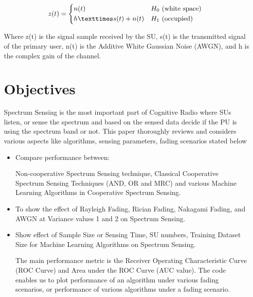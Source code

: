 \begin{equation}
z(t)=
\begin{cases*}
      n(t) & $H_0$ (white space) \\
      h × s(t)+ n(t)   & $H_1$ (occupied)
    \end{cases*}
\end{equation}

Where z(t) is the signal sample received by the SU, s(t) is the transmitted signal of the primary user, n(t) is the Additive White Gaussian Noise (AWGN), and h is the complex gain of the channel.







\section{Objectives}
Spectrum Sensing is the most important part of Cognitive Radio where SUs listen, or sense the spectrum and based on the sensed data decide if the PU is using the spectrum band or not. This paper thoroughly reviews and considers various aspects like algorithms, sensing parameters, fading scenarios stated below
\begin{itemize}

\item Compare performance between:

Non-cooperative Spectrum Sensing technique, Classical Cooperative Spectrum Sensing Techniques (AND, OR and MRC) and various Machine Learning Algorithms in Cooperative Spectrum Sensing. 

\item To show the effect of Rayleigh Fading, Rician Fading, Nakagami Fading, and AWGN at Variance values 1 and 2 on Spectrum Sensing.

\item Show effect of Sample Size or Sensing Time, SU numbers, Training Dataset Size for Machine Learning Algorithms on Spectrum Sensing.

The main performance metric is the Receiver Operating Characteristic Curve (ROC Curve) and Area under the ROC Curve (AUC value).  The code enables us to plot performance of an algorithm under various fading scenarios, or performance of various algorithms under a fading scenario. 


\end{itemize}



